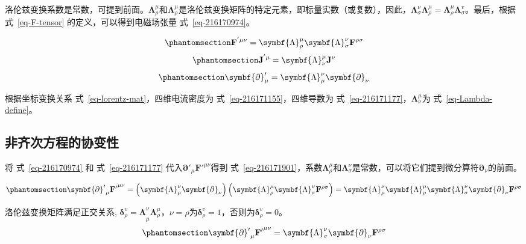 \documentclass[
  chinese,
  a4paper,
  UTF8,
  12pt,
  oneside,
  openany]{ctexbook}
\begin{document}
洛伦兹变换系数是常数，可提到前面。\(\symbf{\Lambda}_{\rho}^{\mu}\)和\(\symbf{\Lambda}_{\rho}^{\mu}\)是洛伦兹变换矩阵的特定元素，即标量实数（或复数），因此，\(\symbf{\Lambda}_{\sigma}^{\nu}\symbf{\Lambda}_{\rho}^{\mu} = \symbf{\Lambda}_{\rho}^{\mu}\symbf{\Lambda}_{\sigma}^{v}\)。最后，根据
式~\ref{eq-F-tensor} 的定义，可以得到电磁场张量 式~\ref{eq-216170974}。

\begin{equation}\protect\phantomsection\label{eq-216170974}{
\mathbf{F}^{'\mu\nu} = \symbf{\Lambda}_{\rho}^{\mu}\symbf{\Lambda}_{\sigma}^{\nu}\mathbf{F}^{\rho\sigma}
}\end{equation}
\begin{equation}\protect\phantomsection\label{eq-216171155}{
\mathbf{J}^{'\mu} = \symbf{\Lambda}_{\nu}^{\mu}\mathbf{J}^{\nu}
}\end{equation}
\begin{equation}\protect\phantomsection\label{eq-216171177}{
\symbf{\partial}_{\mu}' = \symbf{\Lambda}_{\mu}^{\nu}\symbf{\partial}_{\nu}
}\end{equation}

根据坐标变换关系 式~\ref{eq-lorentz-mat}，四维电流密度为
式~\ref{eq-216171155}，四维导数为
式~\ref{eq-216171177}，\(\symbf{\Lambda}_{\nu}^{\mu}\)为
式~\ref{eq-Lambda-define}。

\subsection{非齐次方程的协变性}\label{ux975eux9f50ux6b21ux65b9ux7a0bux7684ux534fux53d8ux6027}

将 式~\ref{eq-216170974} 和 式~\ref{eq-216171177}
代入\({{\symbf{\partial}'}_{\mu}\mathbf{F}'}^{\mu\nu}\)得到
式~\ref{eq-216171901}，系数\(\symbf{\Lambda}_{\rho}^{\mu}\)和\(\symbf{\Lambda}_{\sigma}^{\nu}\)是常数，可以将它们提到微分算符\(\symbf{\partial}_{\nu}\)的前面。

\begin{equation}\protect\phantomsection\label{eq-216171901}{{{\symbf{\partial}'}_{\mu}\mathbf{F}'}^{\mu\nu} = \left( \symbf{\Lambda}_{\mu}^{\nu}\symbf{\partial}_{\nu} \right)\left( \symbf{\Lambda}_{\rho}^{\mu}\symbf{\Lambda}_{\sigma}^{\nu}\mathbf{F}^{\rho\sigma} \right) = \symbf{\Lambda}_{\mu}^{\nu}\symbf{\Lambda}_{\rho}^{\mu}\symbf{\Lambda}_{\sigma}^{\nu}\symbf{\partial}_{\nu}\mathbf{F}^{\rho\sigma}}\end{equation}

洛伦兹变换矩阵满足正交关系,
\({\symbf{\delta}_{\rho}^{v} = \symbf{\Lambda}}_{\mu}^{\nu}\symbf{\Lambda}_{\rho}^{\mu}\)，\(\nu = \rho\)为\(\symbf{\delta}_{\rho}^{v} = 1\)，否则为\(\symbf{\delta}_{\rho}^{v} = 0\)。
\begin{equation}\protect\phantomsection\label{eq-216173227}{{{\symbf{\partial}'}_{\mu}\mathbf{F}'}^{\mu\nu} = \symbf{\Lambda}_{\sigma}^{\nu}\symbf{\partial}_{\nu}\mathbf{F}^{\rho\sigma}}\end{equation}
\end{document}
